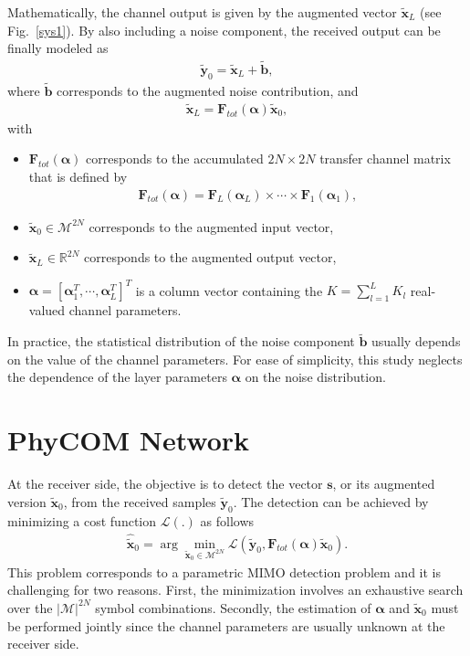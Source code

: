 \documentclass{article}
\begin{document}
Mathematically, the channel output is given by the augmented vector $\tilde{\mathbf{x}}_L$ (see Fig.~\ref{sys1}). By also including a noise component, the received output can be finally modeled as
\begin{align}
\tilde{\mathbf{y}}_0 = \tilde{\mathbf{x}}_L +\tilde{\mathbf{b}},
\end{align}
where $\tilde{\mathbf{b}}$ corresponds to the augmented noise contribution, and
\begin{align}
\tilde{\mathbf{x}}_L = \mathbf{F}_{tot}(\boldsymbol \alpha)\tilde{\mathbf{x}}_{0},\label{eq_comp0}
\end{align}
with
\begin{itemize}
\item $\mathbf{F}_{tot}(\boldsymbol  \alpha)$ corresponds to the accumulated $2N\times 2N$ transfer channel matrix that is defined by
\begin{align}
\mathbf{F}_{tot}(\boldsymbol  \alpha)=\mathbf{F}_{L}(\boldsymbol  \alpha_L)\times \cdots \times \mathbf{F}_{1}(\boldsymbol  \alpha_1),
\end{align}
\item $\tilde{\mathbf{x}}_{0} \in \mathcal{M}^{2N}$ corresponds to the augmented input vector,
\item $\tilde{\mathbf{x}}_{L} \in \mathbb{R}^{2N}$ corresponds to the augmented output vector,  
\item $\boldsymbol\alpha = [\boldsymbol \alpha_{1}^T,\cdots,\boldsymbol \alpha_{L}^T]^T$ is a column vector containing the $K = \sum_{l=1}^L K_l$ real-valued channel parameters.
\end{itemize}

In practice, the statistical distribution of the noise component $\tilde{\mathbf{b}}$ usually depends on the value of the channel parameters. For ease of simplicity, this study neglects the dependence of the layer parameters $\boldsymbol  \alpha$ on the noise distribution.



\section{PhyCOM Network}
\label{phycomarch}

At the receiver side, the objective is to detect the vector $\mathbf{s}$, or its augmented version $\tilde{\mathbf{x}}_{0}$, from the received samples $\tilde{\mathbf{y}}_0 $. The detection can be achieved by minimizing a cost function $\mathcal{L}(.)$ as follows
\begin{align}
\widehat{\tilde{\mathbf{x}}}_{0}=\arg \min_{\tilde{\mathbf{x}}_{0}\in \mathcal{M}^{2N}} \mathcal{L}\left(\tilde{\mathbf{y}}_0, \mathbf{F}_{tot}(\boldsymbol \alpha)\tilde{\mathbf{x}}_{0}\right).
\end{align}
This problem corresponds to a parametric MIMO detection problem and it is challenging for two reasons. First, the minimization involves an exhaustive search over the $|\mathcal{M}|^{2N}$ symbol combinations. Secondly, the estimation of $\boldsymbol \alpha$ and $\tilde{\mathbf{x}}_{0}$ must be performed jointly since the channel parameters are usually unknown at the receiver side.
\end{document}
